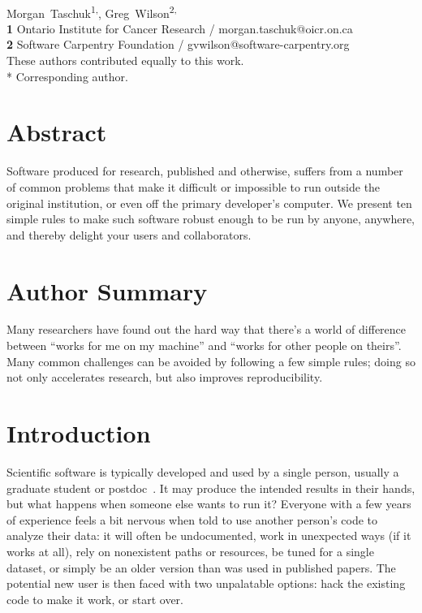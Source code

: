 \documentclass[10pt,letterpaper]{article}
\date{}
\begin{document}
\vspace*{0.2in}

\begin{flushleft}
{\Large
\textbf{}
}
\newline
\\
{Morgan~Taschuk}\textsuperscript{1,\ddag *},
{Greg~Wilson}\textsuperscript{2,\ddag}
\\
\textbf{1} Ontario Institute for Cancer Research / morgan.taschuk@oicr.on.ca
\\
\textbf{2} Software Carpentry Foundation / gvwilson@software-carpentry.org
\\
\bigskip
{\ddag} These authors contributed equally to this work.
\\
* Corresponding author.
\end{flushleft}

\section*{Abstract}

Software produced for research,
published and otherwise,
suffers from a number of common problems
that make it difficult or impossible to run outside the original institution,
or even off the primary developer's computer.
We present ten simple rules to make such software robust enough to be run by anyone,
anywhere,
and thereby delight your users and collaborators.

\section*{Author Summary}

Many researchers have found out the hard way that there's a world of difference
between ``works for me on my machine'' and ``works for other people on theirs''.
Many common challenges can be avoided by following a few simple rules; doing so
not only accelerates research, but also improves reproducibility.

\linenumbers

\section*{Introduction}

Scientific software is typically developed and used by a single person,
usually a graduate student or postdoc~\cite{prins2015}.
It may produce the intended results in their hands,
but what happens when someone else wants to run it? Everyone with
a few years of experience feels a bit nervous when told to use
another person's code to analyze their data:
it will often be undocumented,
work in unexpected ways (if it works at all),
rely on nonexistent paths or resources,
be tuned for a single dataset,
or simply be an older version than was used in published papers.
The potential new user is then faced with two unpalatable options:
hack the existing code to make it work, or start over.
\end{document}
